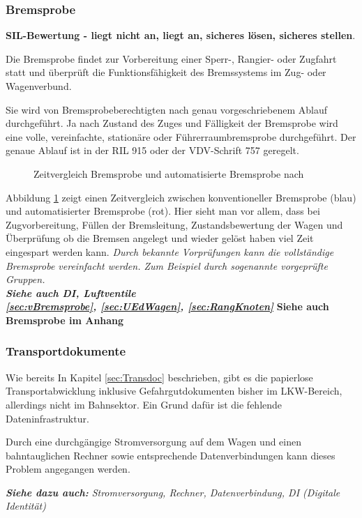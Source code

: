 \subsubsection{Bremsprobe}
\textbf{SIL-Bewertung - liegt nicht an, liegt an, sicheres lösen, sicheres stellen}.\par
Die \gls{Bremsprobe} findet zur Vorbereitung einer Sperr-, Rangier- oder Zugfahrt statt und überprüft die Funktionsfähigkeit des Bremssystems im Zug- oder Wagenverbund.\par
Sie wird von \gls{Bremsprobeberechtigte}n nach genau vorgeschriebenem Ablauf durchgeführt. Ja nach Zustand des Zuges und Fälligkeit der \gls{Bremsprobe} wird eine volle, vereinfachte, stationäre oder Führerraumbremsprobe durchgeführt. Der genaue Ablauf ist in der \acrshort{RIL} 915 oder der VDV-Schrift 757 geregelt.\par
\begin{figure}[htbp] 
    
    \caption{Zeitvergleich Bremsprobe und automatisierte Bremsprobe nach \cite{Stephenson}}
    \label{fig:Zeitvergleich}
\end{figure} 
Abbildung \ref{fig:Zeitvergleich} zeigt einen Zeitvergleich zwischen konventioneller \gls{Bremsprobe} (blau) und automatisierter \gls{Bremsprobe (rot)}. Hier sieht man vor allem, dass  bei Zugvorbereitung, Füllen der Bremsleitung, Zustandsbewertung der Wagen und Überprüfung ob die Bremsen angelegt und wieder gelöst haben viel Zeit eingespart werden kann.
\textit{Durch bekannte Vorprüfungen kann die vollständige \gls{Bremsprobe} vereinfacht werden. Zum Beispiel durch sogenannte vorgeprüfte Gruppen.\\
\textbf{Siehe auch DI, Luftventile\\
\ref{sec:vBremsprobe}, \ref{sec:UEdWagen}, \ref{sec:RangKnoten}}}
\textbf{Siehe auch Bremsprobe im Anhang}
\subsubsection{Transportdokumente}
Wie bereits In Kapitel \ref{sec:Transdoc} beschrieben, gibt es die papierlose Transportabwicklung inklusive Gefahrgutdokumenten bisher im LKW-Bereich, allerdings nicht im Bahnsektor. Ein Grund dafür ist die fehlende Dateninfrastruktur.\par
Durch eine durchgängige Stromversorgung auf dem Wagen und einen bahntauglichen Rechner sowie entsprechende Datenverbindungen kann dieses Problem angegangen werden.\par
\textit{\textbf{Siehe dazu auch:} Stromversorgung, Rechner, Datenverbindung, DI (Digitale Identität)}
